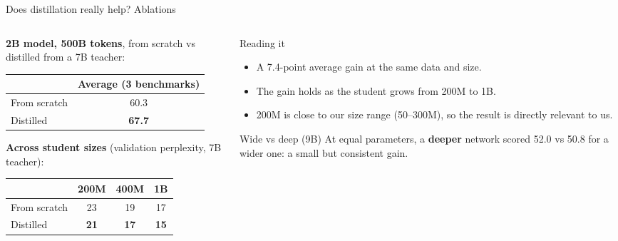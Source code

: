 \documentclass[aspectratio=169,11pt]{beamer}
\begin{document}
\begin{frame}{Does distillation really help? Ablations}
  \begin{columns}[T]
    \begin{column}{0.5\textwidth}
      \small
      \textbf{2B model, 500B tokens}, from scratch vs distilled from a 7B teacher:
      \vspace{1mm}

      \begin{tabular}{@{}lc@{}}
        \toprule
        & Average (3 benchmarks)\\
        \midrule
        From scratch & 60.3\\
        Distilled & \textbf{67.7}\\
        \bottomrule
      \end{tabular}
      \vspace{2mm}

      \textbf{Across student sizes} (validation perplexity, 7B teacher):
      \vspace{1mm}

      \begin{tabular}{@{}lccc@{}}
        \toprule
        & 200M & 400M & 1B\\
        \midrule
        From scratch & 23 & 19 & 17\\
        Distilled & \textbf{21} & \textbf{17} & \textbf{15}\\
        \bottomrule
      \end{tabular}
    \end{column}
    \begin{column}{0.46\textwidth}
      \begin{exampleblock}{Reading it}
        \small
        \begin{itemize}
          \item A 7.4-point average gain at the same data and size.
          \item The gain holds as the student grows from 200M to 1B.
          \item 200M is close to our size range (50--300M), so the result is directly relevant to us.
        \end{itemize}
      \end{exampleblock}
      \begin{block}{Wide vs deep (9B)}
        \small
        At equal parameters, a \textbf{deeper} network scored 52.0 vs 50.8 for a wider one: a small but consistent gain.
      \end{block}
    \end{column}
  \end{columns}
\end{frame}
\end{document}
